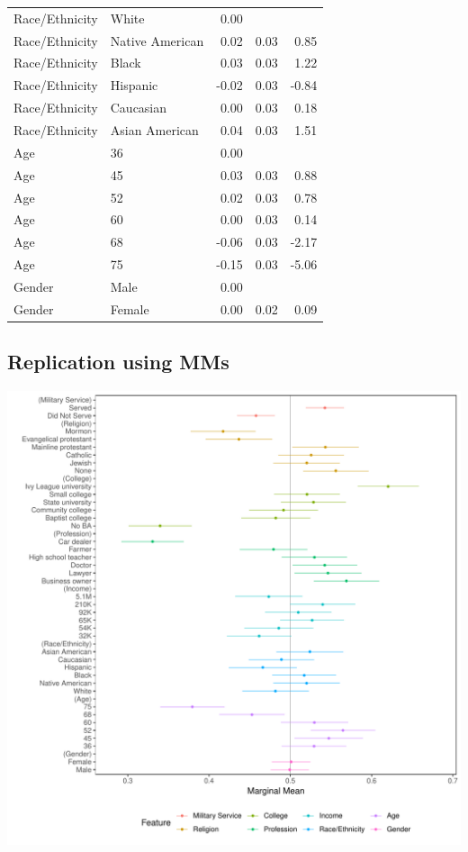 \documentclass[a4paper,12pt]{article}\usepackage[]{graphicx}\usepackage[]{color}
\makeatletter
\def\maxwidth{ %
  \ifdim\Gin@nat@width>\linewidth
    \linewidth
  \else
    \Gin@nat@width
  \fi
}
\newenvironment{knitrout}{}{} %
\makeatother
\begin{document}
\begin{table}[ht]
\begin{tabular}{lp{3in}rrr}
  Race/Ethnicity & White & 0.00 &  &  \\ 
  Race/Ethnicity & Native American & 0.02 & 0.03 & 0.85 \\ 
  Race/Ethnicity & Black & 0.03 & 0.03 & 1.22 \\ 
  Race/Ethnicity & Hispanic & -0.02 & 0.03 & -0.84 \\ 
  Race/Ethnicity & Caucasian & 0.00 & 0.03 & 0.18 \\ 
  Race/Ethnicity & Asian American & 0.04 & 0.03 & 1.51 \\ 
  Age & 36 & 0.00 &  &  \\ 
  Age & 45 & 0.03 & 0.03 & 0.88 \\ 
  Age & 52 & 0.02 & 0.03 & 0.78 \\ 
  Age & 60 & 0.00 & 0.03 & 0.14 \\ 
  Age & 68 & -0.06 & 0.03 & -2.17 \\ 
  Age & 75 & -0.15 & 0.03 & -5.06 \\ 
  Gender & Male & 0.00 &  &  \\ 
  Gender & Female & 0.00 & 0.02 & 0.09 \\ 
   \hline
\end{tabular}
\endgroup
\end{table}


\clearpage

\subsection{Replication using MMs}

\begin{knitrout}
\color{fgcolor}
\includegraphics[width=\maxwidth]{figure/hainmueller_candidate_mm_appendix-1} 

\end{knitrout}
\end{document}
